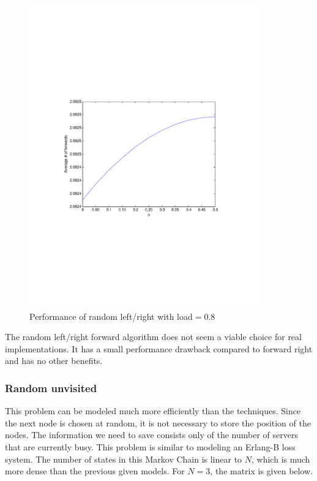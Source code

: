 \documentclass[10pt,a4paper]{article}
\begin{document}
\begin{figure}[h!tb]
\centering
\includegraphics[clip=true, trim=9em 24em 9em 24em, width=0.9\textwidth]{resources/plotrandlrp.pdf}
\caption{Performance of random left/right with load$=0.8$}
\label{validrlrp}
\end{figure}

The random left/right forward algorithm does not seem a viable choice for real implementations. It has a small performance drawback compared to forward right and has no other benefits.

\subsubsection*{Random unvisited}
This problem can be modeled much more efficiently than the techniques. Since the next node is chosen at random, it is not necessary to store the position of the nodes. The information we need to save consists only of the number of servers that are currently busy. This problem is similar to modeling an Erlang-B loss system. The number of states in this Markov Chain is linear to $N$, which is much more dense than the previous given models. For $N=3$, the matrix is given below.
\end{document}
